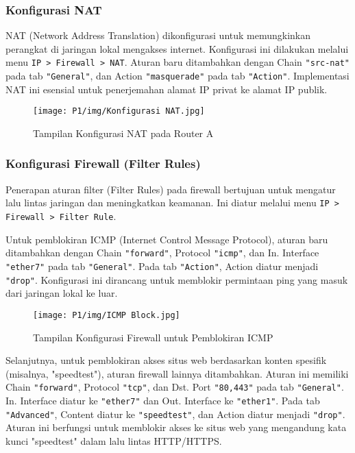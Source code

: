 \subsubsection*{Konfigurasi NAT}
NAT (Network Address Translation) dikonfigurasi untuk memungkinkan perangkat di jaringan lokal mengakses internet. Konfigurasi ini dilakukan melalui menu \texttt{IP > Firewall > NAT}. Aturan baru ditambahkan dengan Chain \texttt{"src-nat"} pada tab \texttt{"General"}, dan Action \texttt{"masquerade"} pada tab \texttt{"Action"}. Implementasi NAT ini esensial untuk penerjemahan alamat IP privat ke alamat IP publik.

\begin{figure}[H]
    \centering
    \texttt{[image: P1/img/Konfigurasi NAT.jpg]} %
    \caption{Tampilan Konfigurasi NAT pada Router A}
    \label{fig:konfigurasi_nat}
\end{figure}

\subsubsection*{Konfigurasi Firewall (Filter Rules)}
Penerapan aturan filter (Filter Rules) pada firewall bertujuan untuk mengatur lalu lintas jaringan dan meningkatkan keamanan. Ini diatur melalui menu \texttt{IP > Firewall > Filter Rule}.

Untuk pemblokiran ICMP (Internet Control Message Protocol), aturan baru ditambahkan dengan Chain \texttt{"forward"}, Protocol \texttt{"icmp"}, dan In. Interface \texttt{"ether7"} pada tab \texttt{"General"}. Pada tab \texttt{"Action"}, Action diatur menjadi \texttt{"drop"}. Konfigurasi ini dirancang untuk memblokir permintaan ping yang masuk dari jaringan lokal ke luar.

\begin{figure}[H]
    \centering
    \texttt{[image: P1/img/ICMP Block.jpg]} %
    \caption{Tampilan Konfigurasi Firewall untuk Pemblokiran ICMP}
    \label{fig:icmp_block_config}
\end{figure}

Selanjutnya, untuk pemblokiran akses situs web berdasarkan konten spesifik (misalnya, "speedtest"), aturan firewall lainnya ditambahkan. Aturan ini memiliki Chain \texttt{"forward"}, Protocol \texttt{"tcp"}, dan Dst. Port \texttt{"80,443"} pada tab \texttt{"General"}. In. Interface diatur ke \texttt{"ether7"} dan Out. Interface ke \texttt{"ether1"}. Pada tab \texttt{"Advanced"}, Content diatur ke \texttt{"speedtest"}, dan Action diatur menjadi \texttt{"drop"}. Aturan ini berfungsi untuk memblokir akses ke situs web yang mengandung kata kunci "speedtest" dalam lalu lintas HTTP/HTTPS.

